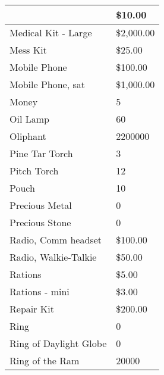 \documentclass[twoside]{book}
\begin{document}
\begin{longtable}{p{1.25in}l}
  &
   \$10.00 
  \tabularnewline
  \hline
      
  \raggedright
           Medical Kit - Large 
  &
   \$2,000.00 
  \tabularnewline
  \hline
      
  \raggedright
           Mess Kit 
  &
   \$25.00 
  \tabularnewline
  \hline
      
  \raggedright
           Mobile Phone 
  &
   \$100.00 
  \tabularnewline
  \hline
      
  \raggedright
           Mobile Phone, sat 
  &
   \$1,000.00 
  \tabularnewline
  \hline
      
  \raggedright
           Money 
  &
   5 
  \tabularnewline
  \hline
      
  \raggedright
           Oil Lamp 
  &
   60 
  \tabularnewline
  \hline
      
  \raggedright
           Oliphant 
  &
   2200000 
  \tabularnewline
  \hline
      
  \raggedright
           Pine Tar Torch 
  &
   3 
  \tabularnewline
  \hline
      
  \raggedright
           Pitch Torch 
  &
   12 
  \tabularnewline
  \hline
      
  \raggedright
           Pouch 
  &
   10 
  \tabularnewline
  \hline
      
  \raggedright
           Precious Metal 
  &
   0 
  \tabularnewline
  \hline
      
  \raggedright
           Precious Stone 
  &
   0 
  \tabularnewline
  \hline
      
  \raggedright
           Radio, Comm headset 
  &
   \$100.00 
  \tabularnewline
  \hline
      
  \raggedright
           Radio, Walkie-Talkie 
  &
   \$50.00 
  \tabularnewline
  \hline
      
  \raggedright
           Rations 
  &
   \$5.00 
  \tabularnewline
  \hline
      
  \raggedright
           Rations - mini 
  &
   \$3.00 
  \tabularnewline
  \hline
      
  \raggedright
           Repair Kit 
  &
   \$200.00 
  \tabularnewline
  \hline
      
  \raggedright
           Ring 
  &
   0 
  \tabularnewline
  \hline
      
  \raggedright
           Ring of Daylight Globe 
  &
   0 
  \tabularnewline
  \hline
      
  \raggedright
           Ring of the Ram 
  &
   20000 
  \tabularnewline
  \hline
      

\end{longtable}
\end{document}
